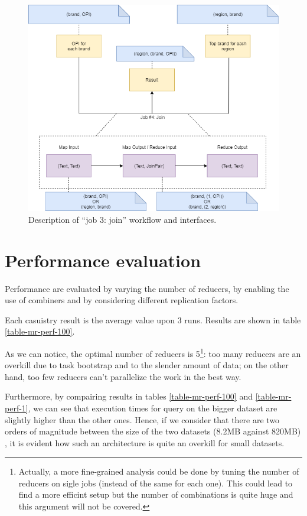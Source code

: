 \begin{figure}[H]
	\centering
	\includegraphics[scale=0.7]{images/2-mapreduce/MR-job-3.png}
	\caption{Description of ``job 3: join'' workflow and interfaces.}
	\label{fig:MR-job-3}
\end{figure}  


\section{Performance evaluation}

Performance are evaluated by varying the number of reducers, by enabling the use of combiners and by considering different replication factors.

Each casuistry result is the average value upon 3 runs. Results are shown in table \ref{table-mr-perf-100}.

As we can notice, the optimal number of reducers is 5\footnote{Actually, a more fine-grained analysis could be done by tuning the number of reducers on sigle jobs (instead of the same for each one). This could lead to find a more efficint setup but the number of combinations is quite huge and this argument will not be covered. }: too many reducers are an overkill due to task bootstrap and to the slender amount of data; on the other hand, too few reducers can't parallelize the work in the best way.

Furthermore, by compairing results in tables \ref{table-mr-perf-100} and \ref{table-mr-perf-1}, we can see that execution times for query on the bigger dataset are slightly higher than the other ones. Hence, if we consider that there are two orders of magnitude between the size of the two datasets (8.2MB against 820MB) , it is evident how such an architecture is quite an overkill for small datasets.

